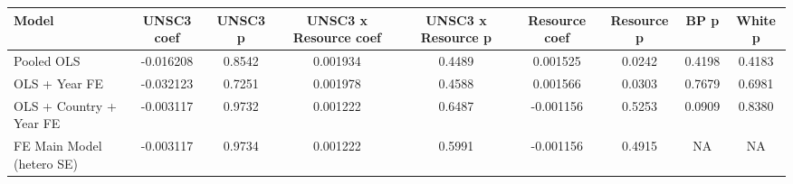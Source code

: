 \begin{tabular}{lcccccccc}
\hline
Model & UNSC3 coef & UNSC3 p & UNSC3 x Resource coef & UNSC3 x Resource p & Resource coef & Resource p & BP p & White p \\
\hline
Pooled OLS & -0.016208 & 0.8542 & 0.001934 & 0.4489 & 0.001525 & 0.0242 & 0.4198 & 0.4183 \\
OLS + Year FE & -0.032123 & 0.7251 & 0.001978 & 0.4588 & 0.001566 & 0.0303 & 0.7679 & 0.6981 \\
OLS + Country + Year FE & -0.003117 & 0.9732 & 0.001222 & 0.6487 & -0.001156 & 0.5253 & 0.0909 & 0.8380 \\
FE Main Model (hetero SE) & -0.003117 & 0.9734 & 0.001222 & 0.5991 & -0.001156 & 0.4915 & NA & NA \\
\hline
\end{tabular}
